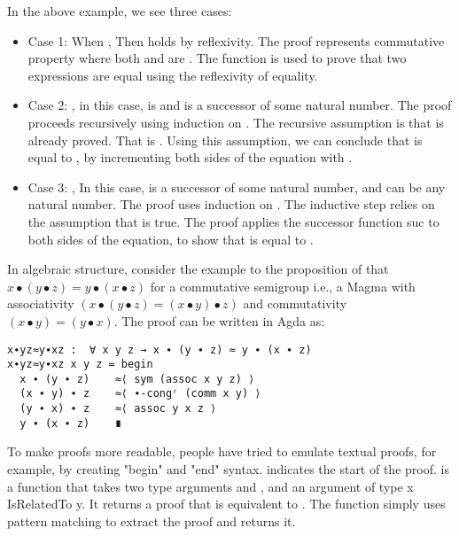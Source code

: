 In the above example, we see three cases:
\begin{itemize}
  \item Case 1: When , Then 
holds by reflexivity. The proof  represents commutative
property where both  and  are . The
 function is used to prove that two expressions are equal using the
reflexivity of equality.
\item Case 2: , in this case,  is 
and  is a successor of some natural number. The proof proceeds
recursively using induction on . The recursive assumption is that
 is already proved. That is .
Using this assumption, we can conclude that  is equal to
, by incrementing both sides of the equation with
.
\item Case 3: , In this case,  is a successor
of some natural number, and  can be any natural number. The proof uses
induction on . The inductive step relies on the assumption that
 is true. The proof applies the successor function suc to both
sides of the equation, to show that  is equal to .
\end{itemize}
In algebraic structure, consider the example to the proposition of that $x ∙ (y
∙ z) = y ∙ (x ∙ z)$  for a commutative semigroup i.e., a Magma with
associativity $(x ∙ (y ∙ z) = (x ∙ y) ∙ z)$ and commutativity $(x ∙ y) = (y ∙
x)$. The proof can be written in Agda as:

\begin{verbatim}
x∙yz≈y∙xz :  ∀ x y z → x ∙ (y ∙ z) ≈ y ∙ (x ∙ z)
x∙yz≈y∙xz x y z = begin
  x ∙ (y ∙ z)    ≈⟨ sym (assoc x y z) ⟩
  (x ∙ y) ∙ z    ≈⟨ ∙-congʳ (comm x y) ⟩
  (y ∙ x) ∙ z    ≈⟨ assoc y x z ⟩
  y ∙ (x ∙ z)    ∎
\end{verbatim}

To make proofs more readable, people have tried to emulate textual proofs, for
example, by creating "begin" and "end" syntax.  indicates the
start of the proof.  is a function that takes two type arguments
 and , and an argument of type x IsRelatedTo y. It returns a
proof that  is equivalent  to . The function
simply uses pattern matching to extract the proof  and returns it.

